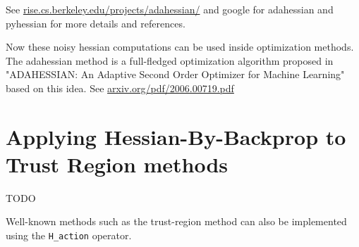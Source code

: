 \documentclass[preview,border={30 30 30 30}]{standalone}
\begin{document}
See \url{rise.cs.berkeley.edu/projects/adahessian/} and google for adahessian and pyhessian for more details and references.

Now these noisy hessian computations can be used inside optimization methods. The adahessian method is a full-fledged optimization algorithm proposed in "ADAHESSIAN: An Adaptive Second Order Optimizer for Machine Learning" based on this idea. See \url{arxiv.org/pdf/2006.00719.pdf}

\section{Applying Hessian-By-Backprop to Trust Region methods}
{\color{red}TODO}

Well-known methods such as the trust-region method can also be implemented using the \texttt{H\_action} operator.

\end{document}
